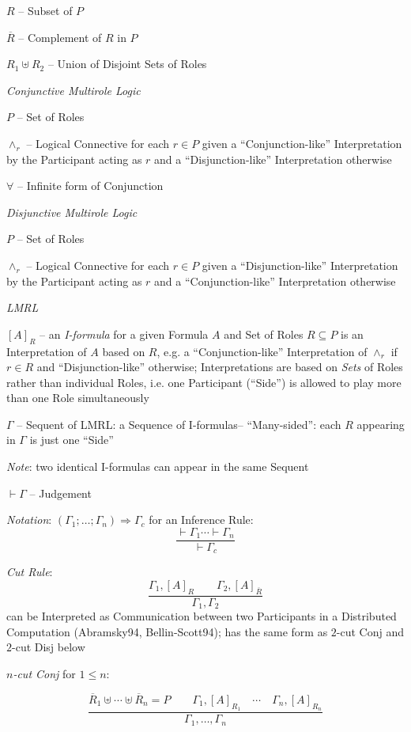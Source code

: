 $R$ -- Subset of $P$

$\overline{R}$ -- Complement of $R$ in $P$

$R_1 \uplus R_2$ -- Union of Disjoint Sets of Roles


\emph{Conjunctive Multirole Logic}

$P$ -- Set of Roles

$\wedge_r$ -- Logical Connective for each $r \in P$ given a
``Conjunction-like'' Interpretation by the Participant acting as $r$
and a ``Disjunction-like'' Interpretation otherwise

$\forall$ -- Infinite form of Conjunction


\emph{Disjunctive Multirole Logic}

$P$ -- Set of Roles

$\wedge_r$ -- Logical Connective for each $r \in P$ given a
``Disjunction-like'' Interpretation by the Participant acting as $r$
and a ``Conjunction-like'' Interpretation otherwise


\emph{LMRL}

$[A]_R$ -- an \emph{I-formula} for a given Formula $A$ and Set of
Roles $R \subseteq P$ is an Interpretation of $A$ based on $R$, e.g. a
``Conjunction-like'' Interpretation of $\wedge_r$ if $r \in R$ and
``Disjunction-like'' otherwise; Interpretations are based on
\emph{Sets} of Roles rather than individual Roles, i.e. one
Participant (``Side'') is allowed to play more than one Role
simultaneously

$\Gamma$ -- Sequent of LMRL: a Sequence of I-formulas--
``Many-sided'': each $R$ appearing in $\Gamma$ is just one ``Side''

\fist \emph{Note}: two identical I-formulas can appear in the same
Sequent

$\vdash \Gamma$ -- Judgement

\fist \emph{Notation}: $(\Gamma_1;\ldots;\Gamma_n) \Rightarrow
\Gamma_c$ for an Inference Rule:
\[
  \frac{\vdash \Gamma_1 \cdots \vdash \Gamma_n}{\vdash \Gamma_c}
\]

\emph{Cut Rule}:
\[
  \frac{
    \Gamma_1,[A]_R \quad\quad \Gamma_2,[A]_{\overline{R}}
  }{
    \Gamma_1,\Gamma_2
  }
\]
can be Interpreted as Communication between two Participants in a
Distributed Computation (Abramsky94, Bellin-Scott94); has the same
form as $2$-cut Conj and $2$-cut Disj below


\emph{$n$-cut Conj} for $1 \leq n$:

\[
  \frac{
    \overline{R}_1 \uplus \cdots \uplus \overline{R}_n = P \quad\quad
      \Gamma_1,[A]_{R_1} \quad \cdots \quad \Gamma_n,[A]_{R_n}
  }{
    \Gamma_1, \ldots, \Gamma_n
  }
\]

